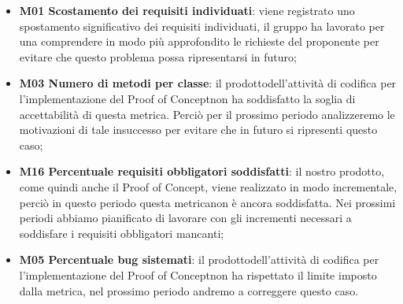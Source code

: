 \begin{itemize}
	\item \textbf{M01 Scostamento dei requisiti individuati}: viene registrato uno spostamento significativo dei requisiti individuati, il gruppo ha lavorato per una comprendere in modo più approfondito le richieste del proponente per evitare che questo problema possa ripresentarsi in futuro;
	\item \textbf{M03 Numero di metodi per classe}: il prodotto\glosp dell'attività di codifica per l'implementazione del Proof of Concept\glosp non ha soddisfatto la soglia di accettabilità di questa metrica\glo. Perciò per il prossimo periodo analizzeremo le motivazioni di tale insuccesso per evitare che in futuro si ripresenti questo caso;
	\item \textbf{M16 Percentuale requisiti obbligatori soddisfatti}: il nostro prodotto\glo, come quindi anche il Proof of Concept\glo, viene realizzato in modo incrementale, perciò in questo periodo questa metrica\glosp non è ancora soddisfatta. Nei prossimi periodi abbiamo pianificato di lavorare con gli incrementi necessari a soddisfare i requisiti obbligatori mancanti;
	\item \textbf{M05 Percentuale bug sistemati}: il prodotto\glosp dell'attività di codifica per l'implementazione del Proof of Concept\glosp non ha rispettato il limite imposto dalla metrica, nel prossimo periodo andremo a correggere questo caso.
\end{itemize}  

